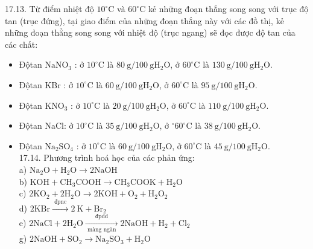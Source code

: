 \documentclass[10pt]{article}
\begin{document}
17.13. Từ điểm nhiệt độ $10^{\circ} \mathrm{C}$ và $60^{\circ} \mathrm{C}$ kẻ những đoạn thẳng song song với trục độ tan (trục đứng), tại giao điểm của những đoạn thẳng này với các đồ thị, kẻ những đoạn thẳng song song với nhiệt độ (trục ngang) sẽ đọc được độ tan của các chất:

\begin{itemize}
  \item Độtan $\mathrm{NaNO}_{3}$ : ở $10^{\circ} \mathrm{C}$ là $80 \mathrm{~g} / 100 \mathrm{~g} \mathrm{H}_{2} \mathrm{O}$, ở $60^{\circ} \mathrm{C}$ là $130 \mathrm{~g} / 100 \mathrm{~g} \mathrm{H}_{2} \mathrm{O}$.
  \item Độtan KBr : ở $10^{\circ} \mathrm{C}$ là $60 \mathrm{~g} / 100 \mathrm{~g} \mathrm{H}_{2} \mathrm{O}$, ở $60^{\circ} \mathrm{C}$ là $95 \mathrm{~g} / 100 \mathrm{~g} \mathrm{H}_{2} \mathrm{O}$.
  \item Độtan $\mathrm{KNO}_{3}$ : ở $10^{\circ} \mathrm{C}$ là $20 \mathrm{~g} / 100 \mathrm{~g} \mathrm{H}_{2} \mathrm{O}$, ở $60^{\circ} \mathrm{C}$ là $110 \mathrm{~g} / 100 \mathrm{~g} \mathrm{H}_{2} \mathrm{O}$.
  \item Độtan NaCl: ở $10^{\circ} \mathrm{C}$ là $35 \mathrm{~g} / 100 \mathrm{~g} \mathrm{H}_{2} \mathrm{O}$, ở $^{\circ} 60^{\circ} \mathrm{C}$ là $38 \mathrm{~g} / 100 \mathrm{~g} \mathrm{H}_{2} \mathrm{O}$.
  \item Độtan $\mathrm{Na}_{2} \mathrm{SO}_{4}$ : ở $10^{\circ} \mathrm{C}$ là $60 \mathrm{~g} / 100 \mathrm{~g} \mathrm{H}_{2} \mathrm{O}$, ở $60^{\circ} \mathrm{C}$ là $45 \mathrm{~g} / 100 \mathrm{~g} \mathrm{H}_{2} \mathrm{O}$.\\
17.14. Phương trình hoá học của các phản ứng:\\
a) $\mathrm{Na}_{2} \mathrm{O}+\mathrm{H}_{2} \mathrm{O} \rightarrow 2 \mathrm{NaOH}$\\
b) $\mathrm{KOH}+\mathrm{CH}_{3} \mathrm{COOH} \rightarrow \mathrm{CH}_{3} \mathrm{COOK}+\mathrm{H}_{2} \mathrm{O}$\\
c) $2 \mathrm{KO}_{2}+2 \mathrm{H}_{2} \mathrm{O} \rightarrow 2 \mathrm{KOH}+\mathrm{O}_{2}+\mathrm{H}_{2} \mathrm{O}_{2}$\\
d) $2 \mathrm{KBr} \xrightarrow{\text { đpnc }} 2 \mathrm{~K}+\mathrm{Br}_{2}$\\
e) $2 \mathrm{NaCl}+2 \mathrm{H}_{2} \mathrm{O} \xrightarrow[\text { màng ngăn }]{\text { đpdd }} 2 \mathrm{NaOH}+\mathrm{H}_{2}+\mathrm{Cl}_{2}$\\
g) $2 \mathrm{NaOH}+\mathrm{SO}_{2} \rightarrow \mathrm{Na}_{2} \mathrm{SO}_{3}+\mathrm{H}_{2} \mathrm{O}$\\

\end{itemize}
\end{document}
